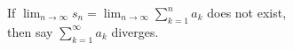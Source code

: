 \documentclass[border=6pt]{standalone}
\begin{document}
\parbox{3in}{If $\displaystyle\lim_{n\to\infty} s_n = \displaystyle\lim_{n\to\infty} \sum_{k=1}^n a_k$ does not exist, \\
then say $\displaystyle\sum_{k=1}^\infty a_k$ diverges.}
\end{document}
